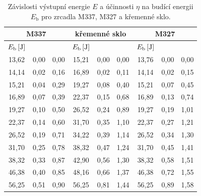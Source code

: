 \begin{table}[!hbt]
\centering
	\begin{tabular}{|c|c|c||c|c|c||c|c|c|}
		\hline
		\multicolumn{3}{|c||}{M337}					&	\multicolumn{3}{c||}{křemenné sklo}					&	\multicolumn{3}{c|}{M327}					\\ \hline
$E_\mathrm{b}\,[\mathrm{J}]$	&	\tabh{E}{J}	&	\tabh{\eta}{\%}	&	$E_\mathrm{b}\,[\mathrm{J}]$	&	\tabh{E}{J}	&	\tabh{\eta}{\%}	&	$E_\mathrm{b}\,[\mathrm{J}]$	&	\tabh{E}{J}	&	\tabh{\eta}{\%}	\\ \hline \hline
13,62	&	0,00	&	0,00	&	15,21	&	0,00	&	0,00	&	13,76	&	0,00	&	0,00	\\ \hline
14,14	&	0,02	&	0,16	&	16,89	&	0,02	&	0,11	&	14,14	&	0,02	&	0,15	\\ \hline
15,21	&	0,04	&	0,29	&	19,27	&	0,08	&	0,40	&	15,21	&	0,07	&	0,45	\\ \hline
16,89	&	0,07	&	0,39	&	22,37	&	0,15	&	0,68	&	16,89	&	0,13	&	0,74	\\ \hline
19,27	&	0,10	&	0,50	&	26,52	&	0,24	&	0,89	&	19,27	&	0,19	&	1,01	\\ \hline
22,37	&	0,14	&	0,60	&	31,70	&	0,35	&	1,10	&	22,37	&	0,27	&	1,21	\\ \hline
26,52	&	0,19	&	0,71	&	34,22	&	0,39	&	1,14	&	26,52	&	0,34	&	1,30	\\ \hline
31,70	&	0,25	&	0,78	&	38,32	&	0,47	&	1,24	&	31,70	&	0,45	&	1,41	\\ \hline
38,32	&	0,33	&	0,87	&	42,90	&	0,56	&	1,30	&	38,32	&	0,58	&	1,51	\\ \hline
46,38	&	0,40	&	0,85	&	48,16	&	0,66	&	1,37	&	46,38	&	0,72	&	1,55	\\ \hline
56,25	&	0,51	&	0,90	&	56,25	&	0,81	&	1,44	&	56,25	&	0,89	&	1,58	\\ \hline

	\end{tabular}
	\caption{Závislosti výstupní energie $E$ a účinnosti $\eta$ na budící energii $E_\mathrm{b}$ pro zrcadla M337, M327 a křemenné sklo.}
	\label{tab:ucinnost_zrcadla}
\end{table}


